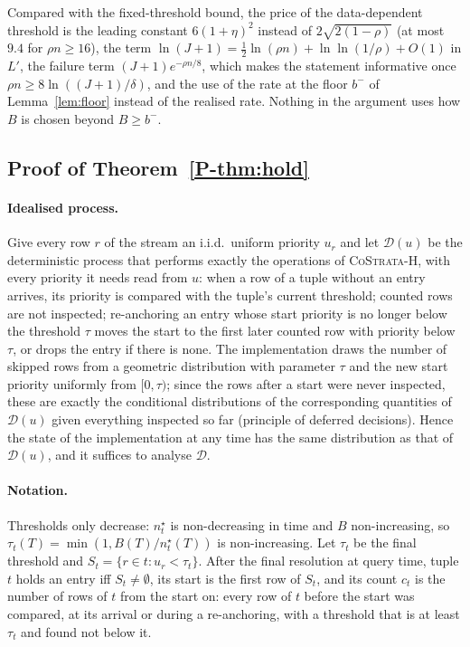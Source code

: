 \documentclass[sigconf,review,anonymous]{acmart}
\newcommand{\csh}{\textsc{CoStrata-H}\xspace}
\newcommand{\nstar}{n^{\star}}
\newcommand{\pref}[1]{\ref{P-#1}}
\begin{document}
Compared with the fixed-threshold bound, the price of the data-dependent threshold is the leading
constant $6(1+\eta)^2$ instead of $2\sqrt{2(1-\rho)}$ (at most $9.4$ for $\rho n\ge16$), the term
$\ln(J+1)=\frac12\ln(\rho n)+\ln\ln(1/\rho)+O(1)$ in $L'$, the failure term $(J+1)e^{-\rho n/8}$, which
makes the statement informative once $\rho n\ge8\ln((J+1)/\delta)$, and the use of the rate at the floor
$b^-$ of Lemma~\ref{lem:floor} instead of the realised rate. Nothing in the argument uses how $B$ is chosen beyond $B\ge b^-$.

\subsection{Proof of Theorem~\pref{thm:hold}}

\paragraph{Idealised process.} Give every row $r$ of the stream an i.i.d.\ uniform priority $u_r$ and let
$\mathcal D(u)$ be the deterministic process that performs exactly the operations of \csh, with every
priority it needs read from $u$: when a row of a tuple without an entry arrives, its priority is compared
with the tuple's current threshold; counted rows are not inspected; re-anchoring an entry whose start
priority is no longer below the threshold $\tau$ moves the start to the first later counted row with
priority below $\tau$, or drops the entry if there is none. The implementation draws the number of skipped
rows from a geometric distribution with parameter $\tau$ and the new start priority uniformly from
$[0,\tau)$; since the rows after a start were never inspected, these are exactly the conditional
distributions of the corresponding quantities of $\mathcal D(u)$ given everything inspected so far
(principle of deferred decisions). Hence the state of the implementation at any time has the same
distribution as that of $\mathcal D(u)$, and it suffices to analyse $\mathcal D$.

\paragraph{Notation.} Thresholds only decrease: $\nstar_t$ is non-decreasing in time and $B$
non-increasing, so $\tau_t(T)=\min(1,B(T)/\nstar_t(T))$ is non-increasing. Let $\tau_t$ be the final
threshold and $S_t=\{r\in t:u_r<\tau_t\}$. After the final resolution at query time, tuple $t$ holds an
entry iff $S_t\ne\emptyset$, its start is the first row of $S_t$, and its count $c_t$ is the number of rows
of $t$ from the start on: every row of $t$ before the start was compared, at its arrival or during a
re-anchoring, with a threshold that is at least $\tau_t$ and found not below it.
\end{document}

